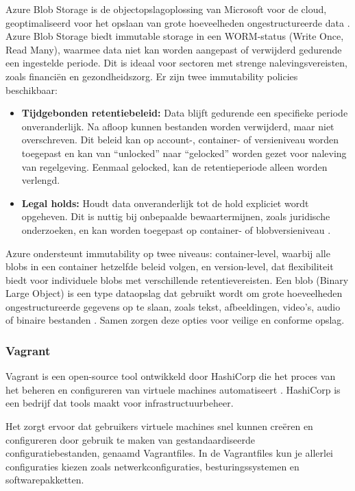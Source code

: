 Azure Blob Storage is de objectopslagoplossing van Microsoft voor de cloud, geoptimaliseerd voor het opslaan van grote hoeveelheden ongestructureerde data \autocite{Dubey2023}. Azure Blob Storage biedt immutable storage in een WORM-status (Write Once, Read Many), waarmee data niet kan worden aangepast of verwijderd gedurende een ingestelde periode. Dit is ideaal voor sectoren met strenge nalevingsvereisten, zoals financiën en gezondheidszorg.  Er zijn twee immutability policies beschikbaar:

\begin{itemize}[leftmargin=1cm]
    \item \textbf{Tijdgebonden retentiebeleid:} Data blijft gedurende een specifieke periode onveranderlijk. Na afloop kunnen bestanden worden verwijderd, maar niet overschreven. Dit beleid kan op account-, container- of versieniveau worden toegepast en kan van ``unlocked'' naar ``gelocked'' worden gezet voor naleving van regelgeving. Eenmaal gelocked, kan de retentieperiode alleen worden verlengd.
    \item \textbf{Legal holds:} Houdt data onveranderlijk tot de hold expliciet wordt opgeheven. Dit is nuttig bij onbepaalde bewaartermijnen, zoals juridische onderzoeken, en kan worden toegepast op container- of blobversieniveau \autocite{Estabrook2024}.
\end{itemize}
Azure ondersteunt immutability op twee niveaus: container-level, waarbij alle blobs in een container hetzelfde beleid volgen, en version-level, dat flexibiliteit biedt voor individuele blobs met verschillende retentievereisten. Een blob (Binary Large Object) is een type dataopslag dat gebruikt wordt om grote hoeveelheden ongestructureerde gegevens op te slaan, zoals tekst, afbeeldingen, video's, audio of binaire bestanden \autocite{Kemp2007}. Samen zorgen deze opties voor veilige en conforme opslag.



\subsubsection{Vagrant}
Vagrant is een open-source tool ontwikkeld door HashiCorp die het proces van het beheren en configureren van virtuele machines automatiseert \autocite{Hashicorp}. HashiCorp is een bedrijf dat tools maakt voor infrastructuurbeheer. 

Het zorgt ervoor dat gebruikers virtuele machines snel kunnen creëren en configureren door gebruik te maken van gestandaardiseerde configuratiebestanden, genaamd Vagrantfiles. In de Vagrantfiles kun je allerlei configuraties kiezen zoals netwerkconfiguraties, besturingssystemen en softwarepakketten. 

